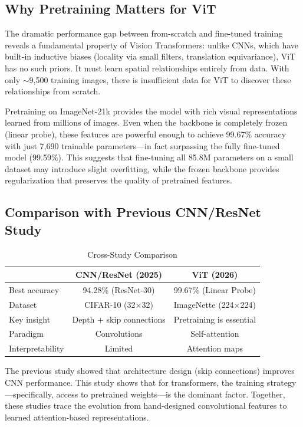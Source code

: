 \documentclass[12pt]{article}
\begin{document}
\subsection{Why Pretraining Matters for ViT}

The dramatic performance gap between from-scratch and fine-tuned training reveals a fundamental property of Vision Transformers: unlike CNNs, which have built-in inductive biases (locality via small filters, translation equivariance), ViT has no such priors. It must learn spatial relationships entirely from data. With only $\sim$9,500 training images, there is insufficient data for ViT to discover these relationships from scratch.

Pretraining on ImageNet-21k provides the model with rich visual representations learned from millions of images. Even when the backbone is completely frozen (linear probe), these features are powerful enough to achieve 99.67\% accuracy with just 7,690 trainable parameters---in fact surpassing the fully fine-tuned model (99.59\%). This suggests that fine-tuning all 85.8M parameters on a small dataset may introduce slight overfitting, while the frozen backbone provides regularization that preserves the quality of pretrained features.

\subsection{Comparison with Previous CNN/ResNet Study}

\begin{table}[H]
\centering
\caption{Cross-Study Comparison}
\begin{tabular}{lcc}
\toprule
& \textbf{CNN/ResNet (2025)} & \textbf{ViT (2026)} \\
\midrule
Best accuracy & 94.28\% (ResNet-30) & 99.67\% (Linear Probe) \\
Dataset & CIFAR-10 (32$\times$32) & ImageNette (224$\times$224) \\
Key insight & Depth + skip connections & Pretraining is essential \\
Paradigm & Convolutions & Self-attention \\
Interpretability & Limited & Attention maps \\
\bottomrule
\end{tabular}
\end{table}

The previous study showed that architecture design (skip connections) improves CNN performance. This study shows that for transformers, the training strategy---specifically, access to pretrained weights---is the dominant factor. Together, these studies trace the evolution from hand-designed convolutional features to learned attention-based representations.
\end{document}
